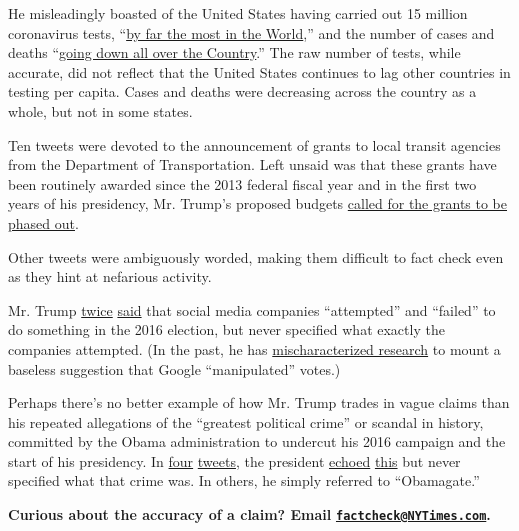 He misleadingly boasted of the United States having carried out 15
million coronavirus tests,
``\href{https://twitter.com/realDonaldTrump/status/1265613475809763328}{by
far the most in the World},'' and the number of cases and deaths
``\href{https://twitter.com/realDonaldTrump/status/1264564734860427265}{going
down all over the Country}.'' The raw number of tests, while accurate,
did not reflect that the United States continues to lag other countries
in testing per capita. Cases and deaths were decreasing across the
country as a whole, but not in some states.

Ten tweets were devoted to the announcement of grants to local transit
agencies from the Department of Transportation. Left unsaid was that
these grants have been routinely awarded since the 2013 federal fiscal
year and in the first two years of his presidency, Mr. Trump's proposed
budgets
\href{https://crsreports.congress.gov/product/pdf/R/R46191\#page=10}{called
for the grants to be phased out}.

Other tweets were ambiguously worded, making them difficult to fact
check even as they hint at nefarious activity.

Mr. Trump
\href{https://twitter.com/realDonaldTrump/status/1265819308699070464}{twice}
\href{https://twitter.com/realDonaldTrump/status/1265601611310739456}{said}
that social media companies ``attempted'' and ``failed'' to do something
in the 2016 election, but never specified what exactly the companies
attempted. (In the past, he has
\href{https://www.nytimes3xbfgragh.onion/2019/08/19/us/politics/google-votes-election-trump.html}{mischaracterized
research} to mount a baseless suggestion that Google ``manipulated''
votes.)

Perhaps there's no better example of how Mr. Trump trades in vague
claims than his repeated allegations of the ``greatest political crime''
or scandal in history, committed by the Obama administration to undercut
his 2016 campaign and the start of his presidency. In
\href{https://twitter.com/realDonaldTrump/status/1265976095209373696}{four}
\href{https://twitter.com/realDonaldTrump/status/1266017512162037761}{tweets},
the president
\href{https://twitter.com/realDonaldTrump/status/1265768877427851265}{echoed}
\href{https://twitter.com/realDonaldTrump/status/1264754622830444544}{this}
but never specified what that crime was. In others, he simply referred
to ``Obamagate.''

\textbf{Curious about the accuracy of a claim? Email}
\textbf{\href{mailto:factcheck@NYTimes.com}{\nolinkurl{factcheck@NYTimes.com}}.}

